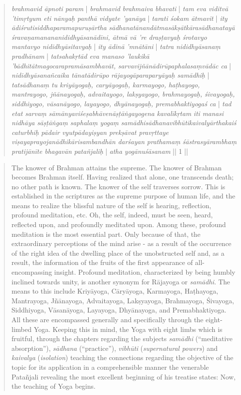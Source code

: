 \begin{quote}
\textit{brahmavid āpnoti param} | \textit{brahmavid brahmaiva bhavati} | \textit{tam eva viditvā 'timṛtyum eti nānyaḥ panthā vidyate 'yanāya} | \textit{tarati śokam ātmavit} | \textit{ity ādiśrutisiddhaparamapuruṣārtha sādhanatānandātmasākṣātkārasādhanatayā śravaṇamanananididhyāsanādīni, ātmā vā 're draṣṭavyaḥ śrotavyo mantavyo nididhyāsitavyaḥ} | \textit{ity ādinā 'mnātāni} | \textit{tatra nididhyāsanaṃ pradhānam} | \textit{tatsahakṛtād eva manaso 'laukikā 'bādhitātmagocarapramāsambhavāt, sarvavijñānādirūpaphalasaṃvādāc ca} | \textit{nididhyāsanañcaika tānatādirūpo rājayogāparaparyāyaḥ samādhiḥ} | \textit{tatsādhanaṃ tu kriyāyogaḥ, caryāyogaḥ, karmayogo, haṭhayogo, mantrayogo, jñānayogaḥ, advaitayogo, lakṣyayogo, brahmayogaḥ, śivayogaḥ, siddhiyogo, vāsanāyogo, layayogo, dhyānayogaḥ, premabhaktiyogaś ca} | \textit{tad etat sarvaṃ sāmānyaviśeṣabhāvenāṣṭāṅgayogena kavalīkṛtam iti manasi nidhāya sāṣṭāṅgaṃ saphalaṃ yogaṃ samādhisādhanavibhūtikaivalyārthakaiś caturbhiḥ pādair vyutpādayiṣyan prekṣāvat pravṛttaye viṣayaprayojanādhikārisambandhān darśayan prathamaṃ śāstrasyārambhaṃ pratijānīte bhagavān patañjaliḥ} | \textit{atha yogānuśāsanam} || 1 ||
  
\end{quote}
\begin{quote}
  The knower of Brahman attains the supreme. The knower of Brahman becomes Brahman itself. Having realized that alone, one transcends death; no other path is known. The knower of the self traverses sorrow. This is established in the scriptures as the supreme purpose of human life, and the means to realize the blissful nature of the self is hearing, reflection, profound meditation, etc. Oh, the self, indeed, must be seen, heard, reflected upon, and profoundly meditated upon. Among these, profound meditation is the most essential part. Only because of that, the extraordinary perceptions of the mind arise - as a result of the occurrence of the right idea of the dwelling place of the unobstructed self and, as a result, the information of the fruits of the first appearance of all-encompassing insight. Profound meditation, characterized by being humbly inclined towards unity, is another synonym for Rājayoga or \textit{samādhi}. The means to this include Kriyāyoga, Cāryāyoga, Karmayoga, Haṭhayoga, Mantrayoga, Jñānayoga, Advaitayoga, Lakṣyayoga, Brahmayoga, Śivayoga, Siddhiyoga, Vāsanāyoga, Layayoga, Dhyānayoga, and Premabhaktiyoga. All these are encompassed generally and specifically through the eight-limbed Yoga. Keeping this in mind, the Yoga with eight limbs which is fruitful, through the chapters regarding the subjects \textit{samādhi} (``meditative absorption''), \textit{sādhana} (``practice''), \textit{vibhūti} (\textit{supernatural powers}) and \textit{kaivalya} (\textit{isolation}) teaching the connections regarding the objective of the topic for its application in a comprehensible manner the venerable Patañjali revealing the most excellent beginning of his treatise states: Now, the teaching of Yoga begins.
  \end{quote}

